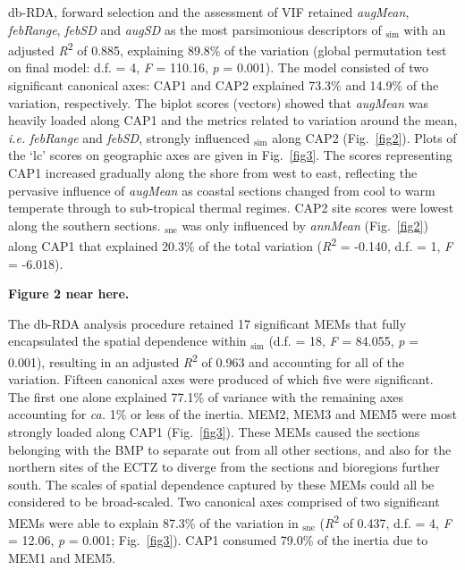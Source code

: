 \documentclass[utf8]{frontiersSCNS} %
\begin{document}
db-RDA, forward selection and the assessment of VIF retained \emph{augMean}, \emph{febRange}, \emph{febSD} and \emph{augSD} as the most parsimonious descriptors of \textbeta$_{\text{sim}}$ with an adjusted \emph{R}\textsuperscript{2} of 0.885, explaining 89.8\% of the variation (global permutation test on final model: d.f. = 4, \emph{F} = 110.16, \emph{p} = 0.001). The model consisted of two significant canonical axes: CAP1 and CAP2 explained 73.3\% and 14.9\% of the variation, respectively. The biplot scores (vectors) showed that \emph{augMean} was heavily loaded along CAP1 and the metrics related to variation around the mean, \emph{i.e.} \emph{febRange} and \emph{febSD}, strongly influenced \textbeta$_{\text{sim}}$ along CAP2 (Fig.~\ref{fig2}). Plots of the `lc' scores on geographic axes are given in Fig.~\ref{fig3}. The scores representing CAP1 increased gradually along the shore from west to east, reflecting the pervasive influence of \emph{augMean} as coastal sections changed from cool to warm temperate through to sub-tropical thermal regimes. CAP2 site scores were lowest along the southern sections. \textbeta$_{\text{sne}}$ was only influenced by \emph{annMean} (Fig.~\ref{fig2}) along CAP1 that explained 20.3\% of the total variation (\emph{R}\textsuperscript{2} = -0.140, d.f. = 1, \emph{F} = -6.018).

\textbf{Figure 2 near here.}

The db-RDA analysis procedure retained 17 significant MEMs that fully encapsulated the spatial dependence within \textbeta$_{\text{sim}}$ (d.f. = 18, \emph{F} = 84.055, \emph{p} = 0.001), resulting in an adjusted \emph{R}\textsuperscript{2} of 0.963 and accounting for all of the variation. Fifteen canonical axes were produced of which five were significant. The first one alone explained 77.1\% of variance with the remaining axes accounting for \emph{ca.} 1\% or less of the inertia. MEM2, MEM3 and MEM5 were most strongly loaded along CAP1 (Fig.~\ref{fig3}). These MEMs caused the sections belonging with the BMP to separate out from all other sections, and also for the northern sites of the ECTZ to diverge from the sections and bioregions further south. The scales of spatial dependence captured by these MEMs could all be considered to be broad-scaled. Two canonical axes comprised of two significant MEMs were able to explain 87.3\% of the variation in \textbeta$_{\text{sne}}$ (\emph{R}\textsuperscript{2} of 0.437, d.f. = 4, \emph{F} = 12.06, \emph{p} = 0.001; Fig.~\ref{fig3}). CAP1 consumed 79.0\% of the inertia due to MEM1 and MEM5.
\end{document}
